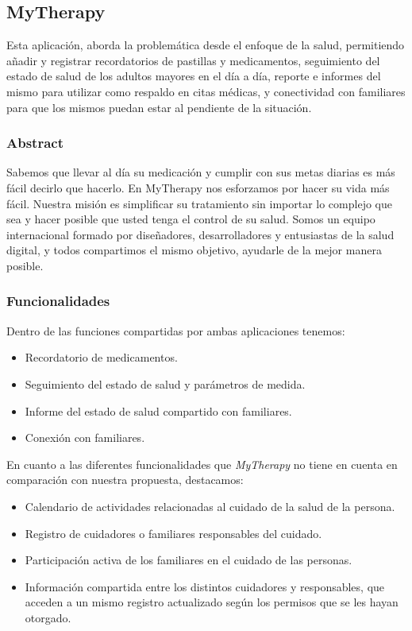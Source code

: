 \documentclass[a4paper,12pt]{article}
\begin{document}
    \subsection{MyTherapy}
    \par Esta aplicación, aborda la problemática desde el enfoque de la salud, permitiendo añadir y registrar recordatorios de pastillas y medicamentos, seguimiento del estado de salud de los adultos mayores en el día a día, reporte e informes del mismo para utilizar como respaldo en citas médicas, y conectividad con familiares para que los mismos puedan estar al pendiente de la situación.
    \subsubsection{Abstract}
    \par Sabemos que llevar al día su medicación y cumplir con sus metas diarias es más fácil decirlo que hacerlo. En MyTherapy nos esforzamos por hacer su vida más fácil. Nuestra misión es simplificar su tratamiento sin importar lo complejo que sea y hacer posible que usted tenga el control de su salud. Somos un equipo internacional formado por diseñadores, desarrolladores y entusiastas de la salud digital, y todos compartimos el mismo objetivo, ayudarle de la mejor manera posible. \cite{MyTherapy}
    \subsubsection{Funcionalidades}
    \par Dentro de las funciones compartidas por ambas aplicaciones tenemos:
    \begin{itemize}
        \item Recordatorio de medicamentos.
        \item Seguimiento del estado de salud y parámetros de medida.
        \item Informe del estado de salud compartido con familiares.
        \item Conexión con familiares.
    \end{itemize}
    \par En cuanto a las diferentes funcionalidades que \textit{MyTherapy} no tiene en cuenta en comparación con nuestra propuesta, destacamos:
    \begin{itemize}
        \item Calendario de actividades relacionadas al cuidado de la salud de la persona.
        \item Registro de cuidadores o familiares responsables del cuidado.
        \item Participación activa de los familiares en el cuidado de las personas.
        \item Información compartida entre los distintos cuidadores y responsables, que acceden a un mismo registro actualizado según los permisos que se les hayan otorgado.
    \end{itemize}
\end{document}
